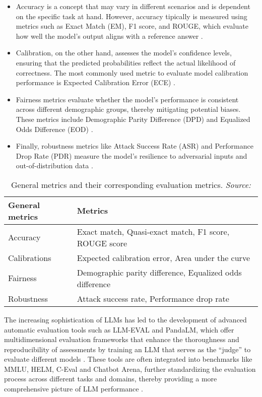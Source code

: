 \begin{itemize}
    \item Accuracy is a concept that may vary in different scenarios and is dependent on the specific task at hand. However, accuracy tipically is measured using metrics such as Exact Match (EM), F1 score, and ROUGE, which evaluate how well the model's output aligns with a reference answer \cite{chang2024survey}.
    \item Calibration, on the other hand, assesses the model’s confidence levels, ensuring that the predicted probabilities reflect the actual likelihood of correctness. The most commonly used metric to evaluate model calibration performance is Expected Calibration Error (ECE) \cite{guo2017calibration}.
    \item Fairness metrics evaluate whether the model's performance is consistent across different demographic groups, thereby mitigating potential biases. These metrics include Demographic Parity Difference (DPD) and Equalized Odds Difference (EOD) \cite{wang2023decodingtrust}.
    \item Finally, robustness metrics like Attack Success Rate (ASR) and Performance Drop Rate (PDR) measure the model's resilience to adversarial inputs and out-of-distribution data \cite{zhu2023promptbench}.
\end{itemize}

\begin{table}[h!]
\centering
\begin{tabular}{|l|l|}
\hline
\textbf{General metrics} & \textbf{Metrics} \\ \hline
Accuracy & Exact match, Quasi-exact match, F1 score, ROUGE score \\ \hline
Calibrations & Expected calibration error, Area under the curve \\ \hline
Fairness & Demographic parity difference, Equalized odds difference \\ \hline
Robustness & Attack success rate, Performance drop rate \\ \hline
\end{tabular}
\caption{General metrics and their corresponding evaluation metrics. \textit{Source:} \cite{chang2024survey}}
\end{table}

The increasing sophistication of LLMs has led to the development of advanced automatic evaluation tools such as LLM-EVAL and PandaLM, which offer multidimensional evaluation frameworks that enhance the thoroughness and reproducibility of assessments by training an LLM that serves as the “judge” to evaluate different models \cite{lin2023llm, wang2023pandalm}. These tools are often integrated into benchmarks like MMLU, HELM, C-Eval and  Chatbot Arena, further standardizing the evaluation process across different tasks and domains, thereby providing a more comprehensive picture of LLM performance \cite{chang2024survey}.

